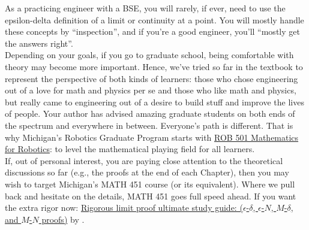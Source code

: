 \begin{tcolorbox}[title = {Reassurance on Limits and Continuity}, sharp corners, colback=lightgold, colframe=black, coltitle=white, breakable, fonttitle=\bfseries]
As a practicing engineer with a BSE, you will rarely, if ever, need to use the epsilon-delta definition of a limit or continuity at a point. You will mostly handle these concepts by ``inspection'', and if you're a good engineer, you'll ``mostly get the answers right''. \\

Depending on your goals, if you go to graduate school, being comfortable with theory may become more important. Hence, we've tried so far in the textbook to represent the perspective of both kinds of learners: those who chose engineering out of a love for math and physics per se and those who like math and physics, but really came to engineering out of a desire to build stuff and improve the lives of people. Your author has advised amazing graduate students on both ends of the spectrum and everywhere in between. Everyone's path is different. That is why Michigan's Robotics Graduate Program starts with \href{https://grizzle.robotics.umich.edu/education/rob501.html}{ROB 501 Mathematics for Robotics}: to level the mathematical playing field for all learners. \\

If, out of personal interest, you are paying close attention to the theoretical discussions so far (e.g., the proofs at the end of each Chapter), then you may wish to target Michigan's MATH 451 course (or its equivalent). Where we pull back and hesitate on the details, MATH 451 goes full speed ahead. If you want the extra rigor now: \href{https://youtu.be/AfrnYS5S8VE}{Rigorous limit proof ultimate study guide: ($\epsilon$-$\delta$, $\epsilon$-$N$, $M$-$\delta$, and $M$-$N$ proofs)} by \bprp.
\end{tcolorbox}






